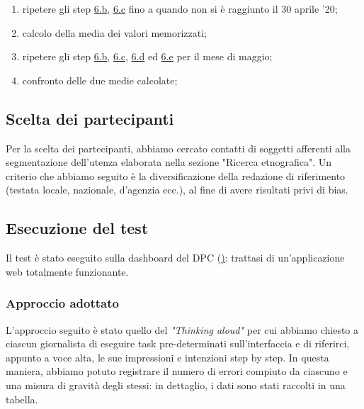 \begin{enumerate}
\begin{enumerate}[label=\alph*.]
        \item ripetere gli step \hyperref[at:b]{6.b}, \hyperref[at:c]{6.c} fino a quando non si è raggiunto il 30 aprile '20; \label{at:d}
        \item calcolo della media dei valori memorizzati; \label{at:e}
        \item ripetere gli step \hyperref[at:b]{6.b}, \hyperref[at:c]{6.c}, \hyperref[at:d]{6.d} ed \hyperref[at:e]{6.e} per il mese di maggio; 
        \item confronto delle due medie calcolate;
    \end{enumerate}
\end{enumerate}

\subsection{Scelta dei partecipanti}
\label{ss:seclta-partecipanti}
Per la scelta dei partecipanti, abbiamo cercato contatti di soggetti afferenti alla segmentazione dell'utenza elaborata nella sezione "Ricerca etnografica". Un criterio che abbiamo seguito è la diversificazione della redazione di riferimento (testata locale, nazionale, d'agenzia ecc.), al fine di avere risultati privi di bias.

\subsection{Esecuzione del test}
\label{ss:vre-esecuzione-test}
Il test è stato eseguito sulla dashboard del DPC (\href{https://opendatadpc.maps.arcgis.com/apps/opsdashboard/index.html#/b0c68bce2cce478eaac82fe38d4138b1}): trattasi di un'applicazione web totalmente funzionante.
\subsubsection{Approccio adottato}
\label{sss:approccio-adottato}
L'approccio seguito è stato quello del \textit{"Thinking aloud"} per cui abbiamo chiesto a ciascun giornalista di eseguire task pre-determinati sull'interfaccia e di riferirci, appunto a voce alta, le sue impressioni e intenzioni step by step.
\noindent
In questa maniera, abbiamo potuto registrare il numero di errori compiuto da ciascuno e una misura di gravità degli stessi: in dettaglio, i dati sono stati raccolti in una tabella.

